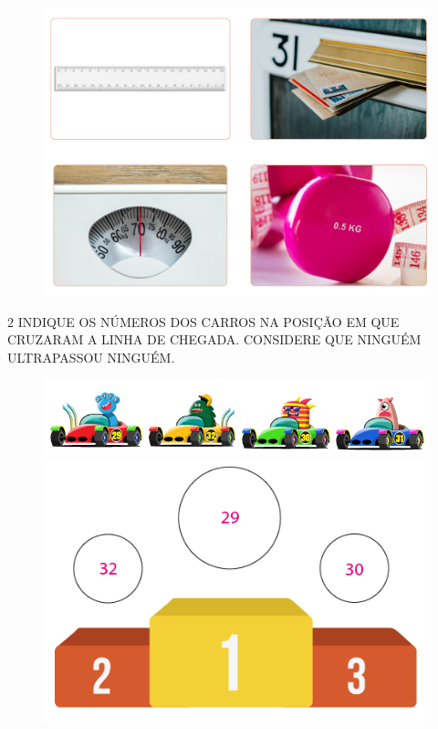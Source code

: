 \begin{figure}[htpb!]
\centering
\includegraphics[width=.6\textwidth]{../ilustracoes/MAT1/SAEB_1ANO_MAT_FIGURA2.png}
\end{figure}


\num{2} INDIQUE OS NÚMEROS DOS CARROS NA POSIÇÃO EM QUE CRUZARAM A LINHA DE CHEGADA. CONSIDERE QUE NINGUÉM ULTRAPASSOU NINGUÉM.


\begin{figure}[htpb!]
\includegraphics[width=\textwidth]{../ilustracoes/MAT1/SAEB_1ANO_MAT_FIGURA3.png}

\centering
\includegraphics[width=.6\textwidth]{../ilustracoes/MAT1/SAEB_1ANO_MAT_FIGURA3a.png}
\end{figure}

